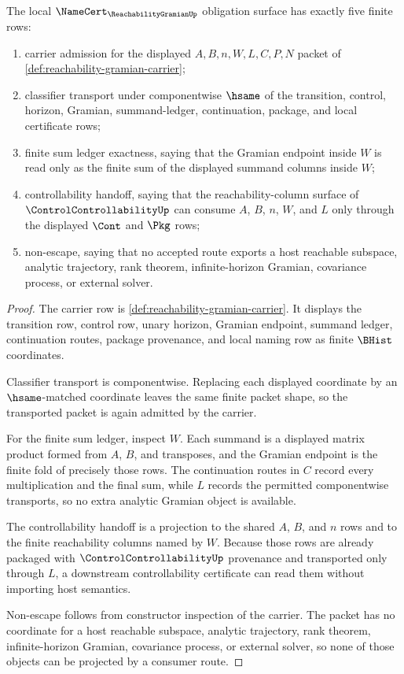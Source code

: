\begin{theorem}
\label{thm:reachability-gramian-namecert-obligations}
The local $\NameCert_{\ReachabilityGramianUp}$ obligation surface has exactly five finite rows:
\begin{enumerate}
\item carrier admission for the displayed $A,B,n,W,L,C,P,N$ packet of \autoref{def:reachability-gramian-carrier};
\item classifier transport under componentwise $\hsame$ of the transition, control, horizon, Gramian, summand-ledger, continuation, package, and local certificate rows;
\item finite sum ledger exactness, saying that the Gramian endpoint inside $W$ is read only as the finite sum of the displayed summand columns inside $W$;
\item controllability handoff, saying that the reachability-column surface of $\ControlControllabilityUp$ can consume $A$, $B$, $n$, $W$, and $L$ only through the displayed $\Cont$ and $\Pkg$ rows;
\item non-escape, saying that no accepted route exports a host reachable subspace, analytic trajectory, rank theorem, infinite-horizon Gramian, covariance process, or external solver.
\end{enumerate}
\end{theorem}
\begin{proof}
The carrier row is \autoref{def:reachability-gramian-carrier}. It displays the transition row, control row, unary horizon, Gramian endpoint, summand ledger, continuation routes, package provenance, and local naming row as finite $\BHist$ coordinates.

Classifier transport is componentwise. Replacing each displayed coordinate by an $\hsame$-matched coordinate leaves the same finite packet shape, so the transported packet is again admitted by the carrier.

For the finite sum ledger, inspect $W$. Each summand is a displayed matrix product formed from $A$, $B$, and transposes, and the Gramian endpoint is the finite fold of precisely those rows. The continuation routes in $C$ record every multiplication and the final sum, while $L$ records the permitted componentwise transports, so no extra analytic Gramian object is available.

The controllability handoff is a projection to the shared $A$, $B$, and $n$ rows and to the finite reachability columns named by $W$. Because those rows are already packaged with $\ControlControllabilityUp$ provenance and transported only through $L$, a downstream controllability certificate can read them without importing host semantics.

Non-escape follows from constructor inspection of the carrier. The packet has no coordinate for a host reachable subspace, analytic trajectory, rank theorem, infinite-horizon Gramian, covariance process, or external solver, so none of those objects can be projected by a consumer route.
\end{proof}

